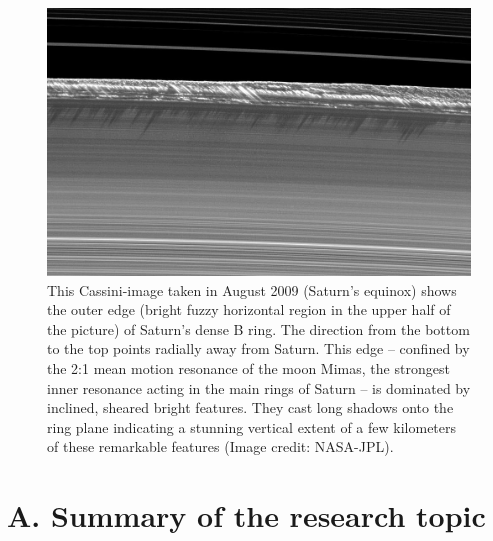\documentclass[11pt, notitlepage]{article} %
\begin{document}
 
 \begin{figure}[ht]
	\centerline{
	\includegraphics[width=.7\textwidth]{Figures/B_Ring_Edge.png}
	}
	\caption{\small%
%
This Cassini-image taken in August 2009 (Saturn's equinox) shows the outer edge (bright fuzzy horizontal region in the upper 
half of the picture) of  Saturn's dense B ring. The direction from the bottom to the top points radially away from Saturn.  This edge 
-- confined by the 2:1 mean motion resonance of the moon Mimas, the strongest inner resonance acting in the main rings of 
Saturn --  is dominated by inclined, sheared bright features. They cast long shadows onto the ring plane indicating a stunning 
vertical extent of a few kilometers of these remarkable features (Image credit: NASA-JPL).
%
}
\label{B_edge_Alpen}
\end{figure}
 
    



\newpage

\section*{A. Summary of the research topic}
\end{document}
